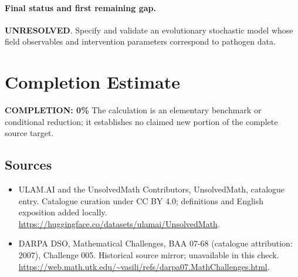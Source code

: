 \documentclass[11pt]{article}
\begin{document}
\paragraph{Final status and first remaining gap.}
\textbf{UNRESOLVED}. Specify and validate an evolutionary stochastic model whose field observables and intervention parameters correspond to pathogen data.

\section{Completion Estimate}
\noindent\textbf{COMPLETION: 0\%}
The calculation is an elementary benchmark or conditional reduction; it establishes no claimed new portion of the complete source target.

\subsection{Sources}
\begin{itemize}
\item[\hypertarget{source:statement:1}{S1}] ULAM.AI and the UnsolvedMath Contributors, UnsolvedMath, catalogue entry. Catalogue curation under CC BY 4.0; definitions and English exposition added locally.
\url{https://huggingface.co/datasets/ulamai/UnsolvedMath}.
\item[\hypertarget{source:statement:2}{S2}] DARPA DSO, Mathematical Challenges, BAA 07-68 (catalogue attribution: 2007), Challenge 005. Historical source mirror; unavailable in this check.
\url{https://web.math.utk.edu/~vasili/refs/darpa07.MathChallenges.html}.
\end{itemize}
\label{end:statement}
\end{document}
